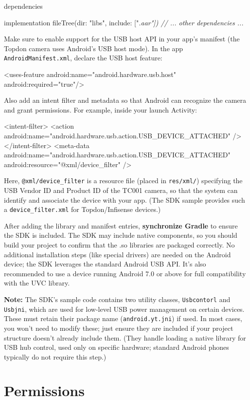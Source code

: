     dependencies {
        implementation fileTree(dir: "libs", include: ["\textit{.aar"])
        // ... other dependencies ...
    }

Make sure to enable support for the USB host API in your app's manifest
(the Topdon camera uses Android's USB host mode). In the app
\texttt{AndroidManifest.xml}, declare the USB host feature:

    <uses-feature android:name="android.hardware.usb.host" android:required="true"/>

Also add an intent filter and metadata so that Android can recognize the
camera and grant permissions. For example, inside your launch Activity:

    <intent-filter>
        <action android:name="android.hardware.usb.action.USB_DEVICE_ATTACHED" />
    </intent-filter>
    <meta-data 
        android:name="android.hardware.usb.action.USB_DEVICE_ATTACHED"
        android:resource="@xml/device_filter" />

Here, \texttt{@xml/device_filter} is a resource file (placed in \texttt{res/xml/})
specifying the USB Vendor ID and Product ID of the TC001 camera, so that
the system can identify and associate the device with your app. (The SDK
sample provides such a \texttt{device_filter.xml} for Topdon/Infisense
devices.)

After adding the library and manifest entries, \textbf{synchronize Gradle} to
ensure the SDK is included. The SDK may include native components, so
you should build your project to confirm that the .so libraries are
packaged correctly. No additional installation steps (like special
drivers) are needed on the Android device; the SDK leverages the
standard Android USB API. It's also recommended to use a device running
Android 7.0 or above for full compatibility with the UVC library.

\textbf{Note:} The SDK's sample code contains two utility classes,
\texttt{Usbcontorl} and \texttt{Usbjni}, which are used for low-level USB power
management on certain devices. These must retain their package name
(\texttt{android.yt.jni}) if
used\cite{CortisolStressIndicator2020}.
In most cases, you won't need to modify these; just ensure they are
included if your project structure doesn't already include them. (They
handle loading a native library for USB hub control, used only on
specific hardware; standard Android phones typically do not require this
step.)

\section{Permissions}

}
